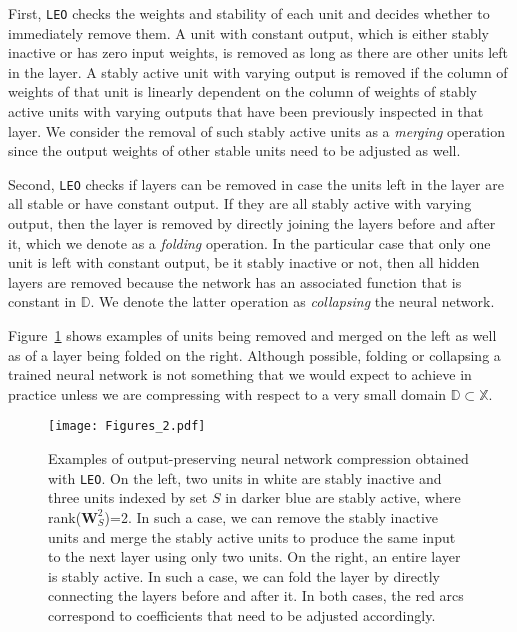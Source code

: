 \documentclass[runningheads]{llncs}
\def\mW{{\bm{W}}}
\def\sD{{\mathbb{D}}}
\def\sX{{\mathbb{X}}}
\begin{document}
    First, \texttt{LEO} checks the weights and stability of each unit and decides whether to immediately remove them. A unit with constant output, which is either stably inactive or has zero input weights, is removed as long as there are other units left in the layer. A stably active unit with varying output is removed if the column of weights of that unit is linearly dependent on the column of weights of stably active units with varying outputs that have been previously inspected in that layer. We consider the removal of such stably active units as a \emph{merging} operation since the output weights of other stable units need to be adjusted as well. 
    
    Second, \texttt{LEO} checks if layers can be removed in case the units left in the layer are all stable or have constant output. If they are all stably active with varying output, then the layer is removed by directly joining the layers before and after it, which we denote as a \emph{folding} operation. In the particular case that only one unit is left with constant output, be it stably inactive or not, then all hidden layers are removed because the network has an associated function that is constant in $\sD$. We denote the latter operation as \emph{collapsing} the neural network. 
    
    Figure~\ref{fig:example} shows examples of units being removed and merged on the left as well as of a layer being folded on the right. Although possible, folding or collapsing a trained neural network is not something that we would expect to achieve in practice unless we are compressing with respect to a very small domain $\sD \subset \sX$.
    
    \begin{figure}
        \begin{center}
            \texttt{[image: Figures\_2.pdf]}
            \caption{Examples of output-preserving neural network compression obtained with \texttt{LEO}. 
On the left, two units in white are stably inactive and three units indexed by set $S$ in darker blue are stably active, where rank($\mW^2_S$)=2. In such a case, we can remove the stably inactive units and merge the stably active units to produce the same input to the next layer using only two units. 
            On the right, an entire layer is stably active. In such a case, we can fold the layer by directly connecting the layers before and after it. In both cases, the  red arcs correspond to coefficients that need to be adjusted accordingly. 
            } \label{fig:example}
        \end{center}
    \end{figure}
    
\end{document}
